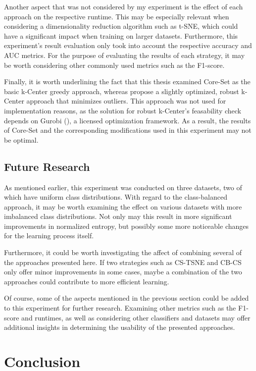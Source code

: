 \documentclass[english,bachelor,ul]{webisthesis} %
\begin{document}
Another aspect that was not considered by my experiment is the effect of each approach on the respective runtime. This may be especially relevant when considering a dimensionality reduction algorithm such as t-SNE, which could have a significant impact when training on larger datasets. Furthermore, this experiment's result evaluation only took into account the respective accuracy and AUC metrics. For the purpose of evaluating the results of each strategy, it may be worth considering other commonly used metrics such as the F1-score.

Finally, it is worth underlining the fact that this thesis examined Core-Set as the basic k-Center greedy approach, whereas \cite{DBLP:conf/iclr/SenerS18} propose a slightly optimized, robust k-Center approach that minimizes outliers. This approach was not used for implementation reasons, as the solution for robust k-Center's feasability check depends on Gurobi (\cite{gurobi}), a licensed optimization framework. As a result, the results of Core-Set and the corresponding modifications used in this experiment may not be optimal.

\section{Future Research}

As mentioned earlier, this experiment was conducted on three datasets, two of which have uniform class distributions. With regard to the class-balanced approach, it may be worth examining the effect on various datasets with more imbalanced class distributions. Not only may this result in more significant improvements in normalized entropy, but possibly some more noticeable changes for the learning process itself.

Furthermore, it could be worth investigating the affect of combining several of the approaches presented here. If two strategies such as CS-TSNE and CB-CS only offer minor improvements in some cases, maybe a combination of the two approaches could contribute to more efficient learning.

Of course, some of the aspects mentioned in the previous section could be added to this experiment for further research. Examining other metrics such as the F1-score and runtimes, as well as considering other classifiers and datasets may offer additional insights in determining the usability of the presented approaches. 

\chapter{Conclusion}
\end{document}
